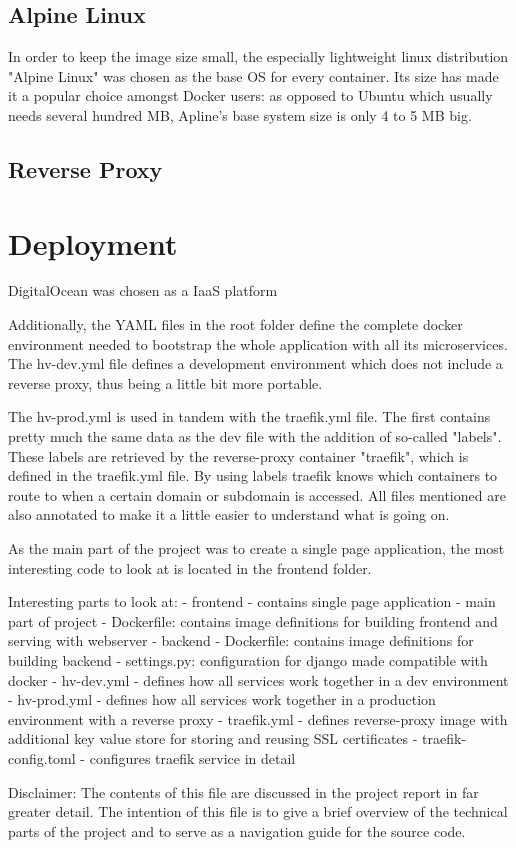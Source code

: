 \subsection{Alpine Linux}
In order to keep the image size small, the especially lightweight linux distribution "Alpine Linux" was chosen as the base OS for every container. Its size has made it a popular choice amongst Docker users: as opposed to Ubuntu which usually needs several hundred MB, Apline's base system size is only 4 to 5 MB big.

\subsection{Reverse Proxy}

\section{Deployment}
DigitalOcean was chosen as a IaaS platform

Additionally, the YAML files in the root folder define the complete docker environment needed to bootstrap the whole application with all its microservices. The hv-dev.yml file defines a development environment which does not include a reverse proxy, thus being a little bit more portable. 

The hv-prod.yml is used in tandem with the traefik.yml file. The first contains pretty much the same data as the dev file with the addition of so-called "labels". These labels are retrieved by the reverse-proxy container "traefik", which is defined in the traefik.yml file. By using labels traefik knows which containers to route to when a certain domain or subdomain is accessed. All files mentioned are also annotated to make it a little easier to understand what is going on.

As the main part of the project was to create a single page application, the most interesting code to look at is located in the frontend folder.

Interesting parts to look at:
- frontend
    - contains single page application - main part of project
    - Dockerfile: contains image definitions for building frontend and serving with webserver
- backend
    - Dockerfile: contains image definitions for building backend
    - settings.py: configuration for django made compatible with docker
- hv-dev.yml
    - defines how all services work together in a dev environment
- hv-prod.yml
    - defines how all services work together in a production environment with a reverse proxy
- traefik.yml
    - defines reverse-proxy image with additional key value store for storing and reusing SSL certificates
- traefik-config.toml
    - configures traefik service in detail

Disclaimer: The contents of this file are discussed in the project report in far greater detail. The intention of this file is to give a brief overview of the technical parts of the project and to serve as a navigation guide for the source code. 
